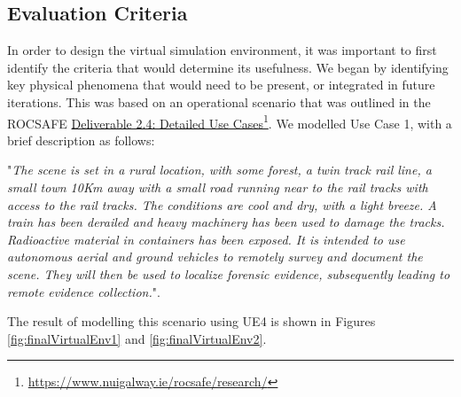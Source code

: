 
\subsection{Evaluation Criteria}\label{subsec:EvalCriteria}
In order to design the virtual simulation environment, it was important to first identify the criteria that would determine its usefulness. We began by identifying key physical phenomena that would need to be present, or integrated in future iterations. This was based on an operational scenario that was outlined in the ROCSAFE \href{https://www.nuigalway.ie/rocsafe/research/}{Deliverable 2.4: Detailed Use Cases}\footnote{\href {https://www.nuigalway.ie/rocsafe/research/}{https://www.nuigalway.ie/rocsafe/research/}}. We modelled Use Case 1, with a brief description as follows:\par
"\textit{The scene is set in a rural location, with some forest, a twin track rail line, a small town 10Km away with a small road running near to the rail tracks with access to the rail tracks. The conditions are cool and dry, with a light breeze. A train has been derailed and heavy machinery has been used to damage the tracks. Radioactive material in containers has been exposed. It is intended to use autonomous aerial and ground vehicles to remotely survey and document the scene. They will then be used to localize forensic evidence, subsequently leading to remote evidence collection.}".\par
The result of modelling this scenario using UE4 is shown in Figures \ref{fig:finalVirtualEnv1} and \ref{fig:finalVirtualEnv2}.


